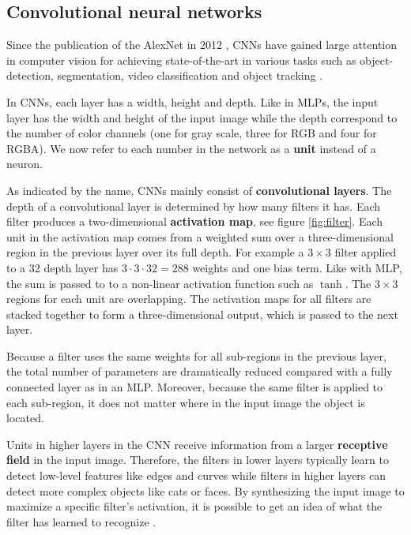 \subsection{Convolutional neural networks}

Since the publication of the AlexNet in 2012 \cite{AlexNet}, CNNs have gained large attention in computer vision for achieving state-of-the-art in various tasks such as object-detection, segmentation, video classification and object tracking \cite{InceptionV3}.




In CNNs, each layer has a width, height and depth. Like in MLPs, the input layer has the width and height of the input image while the depth correspond to the number of color channels (one for gray scale, three for RGB and four for RGBA). We now refer to each number in the network as a \textbf{unit} instead of a neuron.

As indicated by the name, CNNs mainly consist of \textbf{convolutional layers}. The depth of a convolutional layer is determined by how many filters it has. Each filter produces a two-dimensional \textbf{activation map}, see figure \ref{fig:filter}. Each unit in the activation map comes from a weighted sum over a three-dimensional region in the previous layer over its full depth. For example a $3 \times 3$ filter applied to a 32 depth layer has $3 \cdot 3 \cdot 32=288$ weights and one bias term.
Like with MLP, the sum is passed to to a non-linear activation function such as $\tanh$. The $3 \times 3$ regions for each unit are overlapping.
The activation maps for all filters are stacked together to form a three-dimensional output, which is passed to the next layer.

Because a filter uses the same weights for all sub-regions in the previous layer, the total number of parameters are dramatically reduced compared with a fully connected layer as in an MLP. Moreover, because the same filter is applied to each sub-region, it does not matter where in the input image the object is located.

Units in higher layers in the CNN receive information from a larger \textbf{receptive field} in the input image.
Therefore, the filters in lower layers typically learn to detect low-level features like edges and curves while filters in higher layers can detect more complex objects like cats or faces.
By synthesizing the input image to maximize a specific filter's activation, it is possible to get an idea of what the filter has learned to recognize \cite{VisualizeCnn}.

